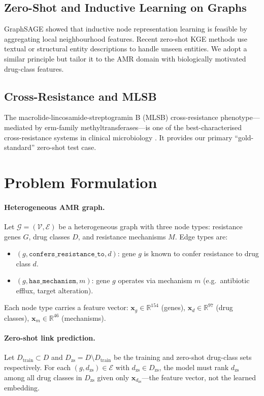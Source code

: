 \documentclass[conference]{IEEEtran}
\begin{document}
\subsection{Zero-Shot and Inductive Learning on Graphs}
GraphSAGE \cite{Hamilton2017sage} showed that inductive node
representation learning is feasible by aggregating local neighbourhood
features. Recent zero-shot KGE methods \cite{Wang2021ZeroShotKGE,
Shi2018openworld} use textual or structural entity descriptions to
handle unseen entities. We adopt a similar principle but tailor it to
the AMR domain with biologically motivated drug-class features.

\subsection{Cross-Resistance and MLSB}
The macrolide-lincosamide-streptogramin B (MLSB) cross-resistance
phenotype—mediated by erm-family methyltransferases—is one of the
best-characterised cross-resistance systems in clinical microbiology
\cite{Leclercq2002mlsb}. It provides our primary ``gold-standard''
zero-shot test case.


\section{Problem Formulation}
\label{sec:problem}

\paragraph{Heterogeneous AMR graph.}
Let $\mathcal{G} = (\mathcal{V}, \mathcal{E})$ be a heterogeneous graph
with three node types: resistance genes $G$, drug classes $D$, and
resistance mechanisms $M$. Edge types are:
\begin{itemize}
  \item $(g, \texttt{confers\_resistance\_to}, d)$: gene $g$ is known to
        confer resistance to drug class $d$.
  \item $(g, \texttt{has\_mechanism}, m)$: gene $g$ operates via
        mechanism $m$ (e.g.\ antibiotic efflux, target alteration).
\end{itemize}
Each node type carries a feature vector: $\mathbf{x}_g \in
\mathbb{R}^{154}$ (genes), $\mathbf{x}_d \in \mathbb{R}^{97}$ (drug
classes), $\mathbf{x}_m \in \mathbb{R}^{46}$ (mechanisms).

\paragraph{Zero-shot link prediction.}
Let $D_{\text{train}} \subset D$ and $D_{\text{zs}} = D \setminus
D_{\text{train}}$ be the training and zero-shot drug-class sets
respectively. For each $(g, d_{\text{zs}}) \in \mathcal{E}$ with $d_{\text{zs}}
\in D_{\text{zs}}$, the model must rank $d_{\text{zs}}$ among all drug
classes in $D_{\text{zs}}$ given only $\mathbf{x}_{d_{\text{zs}}}$—the
feature vector, not the learned embedding.
\end{document}
